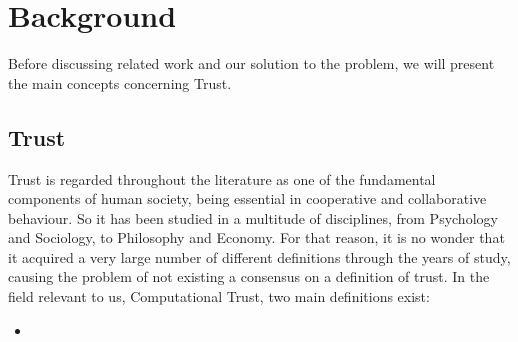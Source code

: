 \section{Background}
\label{sec:Background}



Before discussing related work and our solution to the problem, we will present the main concepts concerning Trust.

\subsection{Trust}
Trust is regarded throughout the literature as one of the fundamental components of human society, being essential in cooperative and collaborative behaviour. So it has been studied in a multitude of disciplines, from Psychology and Sociology, to Philosophy and Economy\cite{Sabater2005}. For that reason, it is no wonder that it acquired a very large number of different definitions through the years of study, causing the problem of not existing a consensus on a definition of trust\cite{Castelfranchi2010}. In the field relevant to us, Computational Trust, two main definitions exist:
\begin{itemize}
	\item 
\end{itemize}